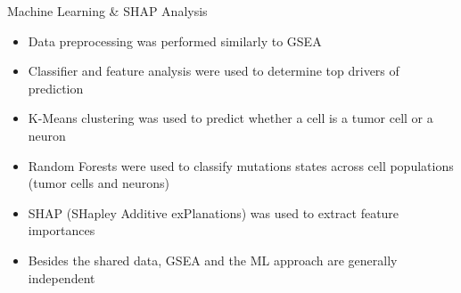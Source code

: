 \documentclass[10pt, aspectratio=169]{beamer}
\begin{document}
\begin{frame}{Machine Learning \& SHAP Analysis}
  \begin{itemize}
    \item Data preprocessing was performed similarly to GSEA
    \item Classifier and feature analysis were used to determine top drivers of prediction
    \item K-Means clustering was used to predict whether a cell is a tumor cell or a neuron
    \item Random Forests were used to classify mutations states across cell populations (tumor cells and neurons)
    \item SHAP (SHapley Additive exPlanations) was used to extract feature importances
    \item Besides the shared data, GSEA and the ML approach are generally independent
  \end{itemize}
\end{frame}
\end{document}
